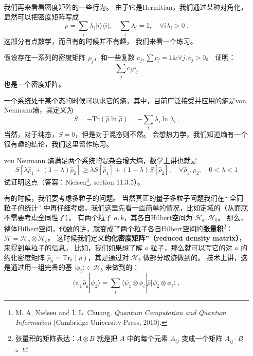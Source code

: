 我们再来看看密度矩阵的一些行为。 由于它是Hermitian，我们通过某种对角化，显然可以把密度矩阵写成
\begin{equation}
\rho = \sum_i\lambda_i|i\rangle\langle i|,\quad \sum_i\lambda_i = 1,\quad \forall i\lambda_i > 0 ~.
\end{equation}
这部分有点数学，而且有的时候并不有趣， 我们来看一个练习。

\begin{exercise}{}
假设存在一系列的密度矩阵 $\rho_j$，和一些复数 $c_j, \sum c_j = 1 \& \forall j, c_j>0$。 证明：
\begin{equation}
\sum_j c_j \rho_j 
\end{equation}
也是一个密度矩阵。
\end{exercise}

一个系统处于某个态的时候可以求它的熵，其中，目前广泛接受并应用的熵是von Neumann熵，其定义为
\begin{equation}
S=-\text{Tr}(\hat\rho\ln\hat\rho)=-\sum_i\lambda_i\ln\lambda_i~.
\end{equation}
当然，对于纯态，$S=0$，但是对于混态则不然。 会想热力学，我们知道熵有一个很有趣的结论，我们这里留作练习。

\begin{exercise}{}
von Neumann 熵满足两个系统的混杂会增大熵，数学上讲也就是
\begin{equation}
S[\lambda\hat\rho_1+(1-\lambda)\hat\rho_2]\ge\lambda S[\hat\rho_1]+(1-\lambda) S[\hat\rho_2],\quad \forall \hat\rho_1,\rho_2,\quad 0<\lambda<1
\end{equation}
试证明这点（答案：Nielsen\footnote{M. A. Nielsen and I. L. Chuang, \textsl{Quantum Computation and Quantum Information} (Cambridge University Press, 2010).}, section 11.3.5）。
\end{exercise}

有的时候，我们要考虑多粒子的问题。 当然真正的量子多粒子问题我们在“ 全同粒子的统计” 中再仔细考虑，我们这里先看一些简单的情况，比如定域的（从而就不需要考虑全同性了）。 有两个粒子 $a, b$，其各自Hilbert空间为 $\mathcal{H}_a, \mathcal{H}_b$。 那么，整体Hilbert空间，代数的讲，就变成了两个粒子各自Hilbert空间的\textbf{张量积}\footnote{张量积的矩阵表达：$A\otimes B$ 就是把 $A$ 中的每个元素 $A_{ij}$ 变成一个矩阵 $A_{ij}\cdot B$。}：$\mathcal{H} = \mathcal{H}_a\otimes \mathcal{H}_b$。 这时候我们定义\textbf{约化密度矩阵”（reduced density matrix）}，来得到单粒子的信息。 比如，我们如果想了解 $a$ 粒子，那么就可以写它的对 $a$ 的约化密度矩阵 $\hat\rho_a=\text{Tr}_b(\hat\rho)$，其是通过对 $\mathcal{H}_b$ 做部分取迹做到的。 技术上讲，这是通过用一组完备的基 $|\phi_i\rangle \in\mathcal{H}_b$ 来做到的：
\begin{equation}
\langle\psi_1\hat\rho_a|\psi_2\rangle=\sum_i\langle\psi_1\otimes\phi_i|\hat\rho|\psi_2\otimes\phi_i\rangle~,
\end{equation}

